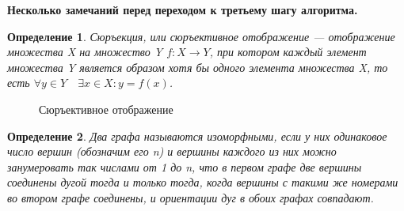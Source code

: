 \documentclass[a4paper, 14pt]{extarticle}
\newtheorem{definition}{Определение}
\begin{document}
\textbf{Несколько замечаний перед переходом к третьему шагу алгоритма.}
\begin{definition}
Сюръекция, или сюръективное отображение --- отображение множества X на множество Y $f: X \to Y$, при котором каждый элемент множества Y является образом хотя бы одного элемента множества X, то есть $\forall y \in Y \quad \exists x \in X : y = f(x)$.
\end{definition}
\begin{figure}[h!]
\caption{Сюръективное отображение}
\end{figure}
\begin{definition}
Два графа называются изоморфными, если у
них одинаковое число вершин (обозначим его n) и вершины каждого из них можно
занумеровать так числами от 1 до n, что в первом графе две вершины соединены дугой
тогда и только тогда, когда вершины с такими же номерами во втором графе соединены, и ориентации дуг в обоих графах совпадают.
\end{definition}
\end{document}
